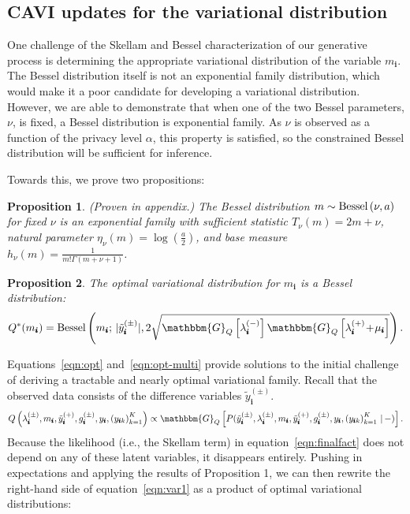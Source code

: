 \documentclass{article}
\newcommand{\subs}{\pmb{i}}
\newcommand{\wsup}[2]{#1_{\subs}^{(#2)}}
\newcommand{\ytP}{\wsup{\tilde{y}}{+}}
\newcommand{\ytPM}{\wsup{\tilde{y}}{\pm}}
\newcommand{\ysk}{y_{\subs k}}
\newcommand{\ys}{y_{\subs}}
\newcommand{\lamP}{\wsup{\lambda}{+}}
\newcommand{\lamM}{\wsup{\lambda}{-}}
\newcommand{\lamPM}{\wsup{\lambda}{\pm}}
\newcommand{\gPM}{\wsup{g}{\pm}}
\newcommand{\mus}{\mu_{\subs}}
\newcommand{\ms}{m_{\subs}}
\newcommand{\Bess}[1]{\textup{Bessel}\left( #1 \right)}
\newcommand{\Gq}[1]{\mathbbm{G}_Q\left[#1\right]}
\newcommand{\teq}{\!=\!}
\newcommand{\tp}{\!+\!}
\newtheorem{proposition}{Proposition}
\begin{document}
  \subsection{CAVI updates for the variational distribution}
  \label{sec:cavi}
  One challenge of the Skellam and Bessel characterization of our generative
  process is determining the appropriate variational distribution of the
  variable $\ms$. The Bessel distribution itself is not an exponential family
  distribution, which would make it a poor candidate for developing a
  variational distribution. However, we are able to demonstrate that when one of
  the two Bessel parameters, $\nu$, is fixed, a Bessel distribution is
  exponential family. As $\nu$ is observed as a function of the privacy level
  $\alpha$, this property is satisfied, so the constrained Bessel distribution
  will be sufficient for inference.

  Towards this, we prove two propositions:
  
  \begin{proposition} (Proven in appendix.) The Bessel
  distribution $m \sim \Bess{\nu, a}$ for fixed $\nu$ is an exponential family
  with sufficient statistic $T_{\nu}(m) \teq 2m \tp \nu$, natural parameter
  $\eta_{\nu}(m)\teq \log(\frac{a}{2})$, and base measure $h_{\nu}(m) \teq
  \frac{1}{m!\Gamma(m\tp\nu\tp 1)}$. 
  \end{proposition}
  
  \begin{proposition} The optimal variational distribution for $\ms$ is a Bessel
  distribution:
  \begin{equation}
  \label{eqn:opt}
  Q^*(\ms) = \Bess{\ms; \, |\ytPM|, 2\sqrt{\Gq{\lamM}\Gq{\lamP \tp \mus}}}.
  \end{equation}
  \end{proposition}

  Equations~\ref{eqn:opt} and~\ref{eqn:opt-multi} provide solutions to the initial
  challenge of deriving a tractable and nearly optimal variational family.
  Recall that the observed data consists of the difference variables $\ytPM$.
  \begin{equation}
    \label{eqn:var1}
  Q \left( \lamPM, \ms, \ytP, \gPM, \ys, \left(\ysk\right)_{k=1}^K\right) \propto
   \Gq{P(\ytPM, \lamPM, \ms, \ytP, \gPM, \ys, \left(\ysk\right)_{k=1}^K \,|\,-)}.
  \end{equation}
  Because the likelihood (i.e., the Skellam term) in
  equation~\ref{eqn:finalfact} does not depend on any of these latent variables,
  it disappears entirely. Pushing in expectations and applying the results of
  Proposition 1, we can then rewrite the right-hand side of
  equation~\ref{eqn:var1} as a product of optimal variational distributions:
    
\end{document}
